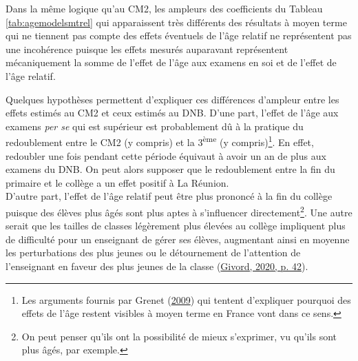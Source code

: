 \documentclass[
]{book}
\begin{document}
\quad Dans la même logique qu'au CM2, les ampleurs des coefficients du Tableau \ref{tab:agemodelsmtrel} qui apparaissent très différents des résultats à moyen terme qui ne tiennent pas compte des effets éventuels de l'âge relatif ne représentent pas une incohérence puisque les effets mesurés auparavant représentent mécaniquement la somme de l'effet de l'âge aux examens en soi et de l'effet de l'âge relatif.

\quad Quelques hypothèses permettent d'expliquer ces différences d'ampleur entre les effets estimés au CM2 et ceux estimés au DNB. D'une part, l'effet de l'âge aux examens \emph{per se} qui est supérieur est probablement dû à la pratique du redoublement entre le CM2 (y compris) et la 3\textsuperscript{ème} (y compris)\footnote{Les arguments fournis par Grenet (\protect\hyperlink{ref-GRE:09}{2009}) qui tentent d'expliquer pourquoi des effets de l'âge restent visibles à moyen terme en France vont dans ce sens.}. En effet, redoubler une fois pendant cette période équivaut à avoir un an de plus aux examens du DNB. On peut alors supposer que le redoublement entre la fin du primaire et le collège a un effet positif à La Réunion.\\
D'autre part, l'effet de l'âge relatif peut être plus prononcé à la fin du collège puisque des élèves plus âgés sont plus aptes à s'influencer directement\footnote{On peut penser qu'ils ont la possibilité de mieux s'exprimer, vu qu'ils sont plus âgés, par exemple.}. Une autre serait que les tailles de classes légèrement plus élevées au collège impliquent plus de difficulté pour un enseignant de gérer ses élèves, augmentant ainsi en moyenne les perturbations des plus jeunes ou le détournement de l'attention de l'enseignant en faveur des plus jeunes de la classe (\protect\hyperlink{ref-GIV:20}{Givord, 2020, p. 42}).

\newpage
\begingroup\fontsize{8}{10}\selectfont
\end{document}
